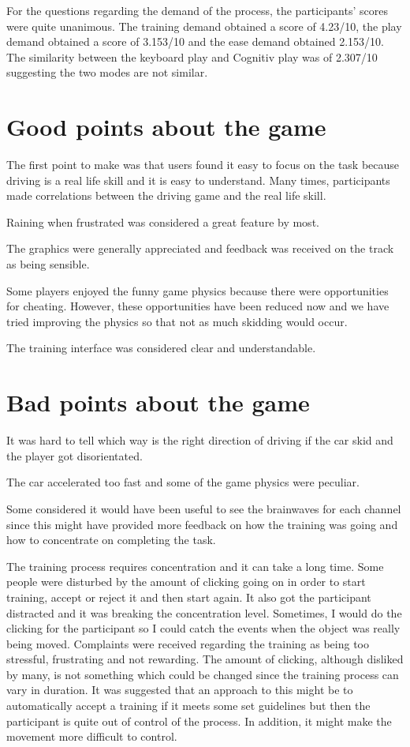 For the questions regarding the demand of the process, the participants' scores were quite unanimous. The training demand obtained a score of 4.23/10, the play demand obtained a score of 3.153/10 and the ease demand obtained 2.153/10. The similarity between the keyboard play and Cognitiv play was of 2.307/10 suggesting the two modes are not similar.

\section{Good points about the game}
The first point to make was that users found it easy to focus on the task because driving is a real life skill and it is easy to understand. Many times, participants made correlations between the driving game and the real life skill.

Raining when frustrated was considered a great feature by most.

The graphics were generally appreciated and feedback was received on the track as being sensible. 

Some players enjoyed the funny game physics because there were opportunities for cheating. However, these opportunities have been reduced now and we have tried improving the physics so that not as much skidding would occur.

The training interface was considered clear and understandable.

\section{Bad points about the game}
It was hard to tell which way is the right direction of driving if the car skid and the player got disorientated.

The car accelerated too fast and some of the game physics were peculiar. 

Some considered it would have been useful to see the brainwaves for each channel since this might have provided more feedback on how the training was going and how to concentrate on completing the task.

The training process requires concentration and it can take a long time. Some people were disturbed by the amount of clicking going on in order to start training, accept or reject it and then start again. It also got the participant distracted and it was breaking the concentration level. Sometimes, I would do the clicking for the participant so I could catch the events when the object was really being moved. Complaints were received regarding the training as being too stressful, frustrating and not rewarding. The amount of clicking, although disliked by many, is not something which could be changed since the training process can vary in duration. It was suggested that an approach to this might be to automatically accept a training if it meets some set guidelines but then the participant is quite out of control of the process. In addition, it might make the movement more difficult to control.

